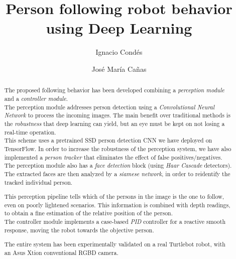 \documentclass[11pt, a4paper]{svproc}
\title{Person following robot behavior using Deep Learning}
\author{Ignacio Condés
		\and José María Cañas}
\institute{Universidad Rey Juan Carlos}
\begin{document}
	\maketitle
	
	\begin{abstract}
		The proposed following behavior has been developed combining a \emph{perception module} and a \emph{controller module}.\\
		
		The perception module addresses person detection using a \emph{Convolutional Neural Network} to process the incoming images. The main benefit over traditional methods is the \emph{robustness} that deep learning can yield, but an eye must be kept on not losing a real-time operation.\\
		
		This scheme uses a pretrained SSD person detection CNN we have deployed on TensorFlow. In order to increase the robustness of the perception system, we have also implemented a \emph{person tracker} that eliminates the effect of false positives/negatives. The perception module also has a \emph{face detection} block (using \emph{Haar Cascade} detectors). The extracted faces are then analyzed by a \emph{siamese network}, in order to reidentify the tracked individual person.
		
		This perception pipeline tells which of the persons in the image is the one to follow, even on poorly lightened scenarios. This information is combined with depth readings, to obtain a fine estimation of the relative position of the person.\\
		
		The controller module implements a case-based \emph{PID} controller for a reactive smooth response, moving the robot towards the objective person.
		
		
		
		The entire system has been experimentally validated on a real Turtlebot robot, with an Asus Xtion conventional RGBD camera.
	\end{abstract}

	
	
\end{document}
